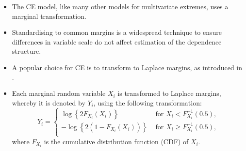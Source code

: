 \documentclass{article}
\numberwithin{equation}{section}
\begin{document}
\begin{itemize}
  \item The CE model, like many other models for multivariate extremes, uses a marginal transformation.
  \item Standardising to common margins is a widespread technique to ensure differences in variable scale do not affect estimation of the dependence structure. 
  \item A popular choice for CE is to transform to Laplace margins, as introduced in \citet{Keef2013}.
  \item Each marginal random variable $X_i$ is transformed to Laplace margins, whereby it is denoted by $Y_i$, using the following transformation:
  \begin{equation} \label{eq:laplace}
    Y_i = \begin{cases}
      \log\left\{2F_{X_i}(X_i)\right\} &\text{ for } X_i < F_{X_i}^{-1}(0.5), \\
      -\log\left\{2(1 - F_{X_i}(X_i))\right\} &\text{ for } X_i \ge F_{X_i}^{-1}(0.5), \\
    \end{cases}
  \end{equation}
  where $F_{X_i}$ is the cumulative distribution function (CDF) of $X_i$.
\end{itemize}

\vspace{1cm}
\end{document}
